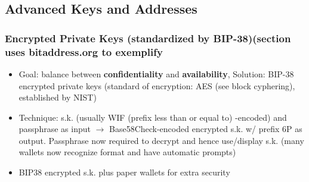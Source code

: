 \documentclass[english, 11pt]{article}
\begin{document}
\subsection{Advanced Keys and Addresses}
\subsubsection{Encrypted Private Keys (standardized by BIP-38)(section uses bitaddress.org to exemplify}
\begin{itemize}
    \item Goal: balance between \textbf{confidentiality} and \textbf{availability}, Solution: BIP-38 encrypted private keys (standard of encryption: AES (see block cyphering), established by NIST)
    \item Technique: s.k. (usually WIF (prefix less than or equal to) -encoded) and passphrase as input $\rightarrow$ Base58Check-encoded encrypted s.k. w/ prefix 6P as output. Passphrase now required to decrypt and hence use/display s.k. (many wallets now recognize format and have automatic prompts)
    \item BIP38 encrypted s.k. plus paper wallets for extra security
\end{itemize}
\end{document}
